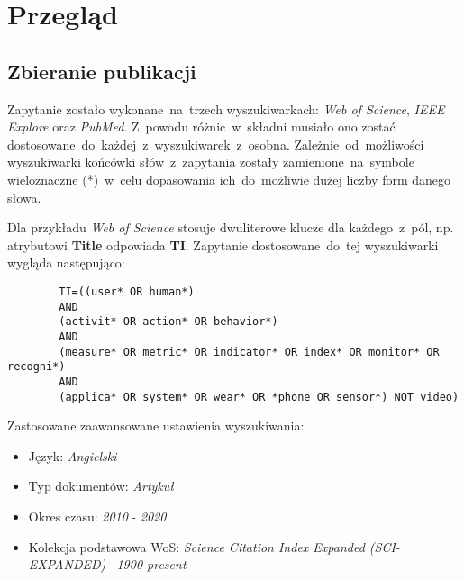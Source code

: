 \section{Przegląd}

\subsection{Zbieranie publikacji}
Zapytanie zostało wykonane~na~trzech wyszukiwarkach: \textit{Web of Science}, \textit{IEEE Explore} oraz \textit{PubMed}. Z~powodu różnic~w~składni musiało ono zostać dostosowane~do~każdej~z~wyszukiwarek~z~osobna. Zależnie~od~możliwości wyszukiwarki końcówki słów~z~zapytania zostały zamienione~na~symbole wieloznaczne (*)~w~celu dopasowania ich~do~możliwie dużej liczby form danego słowa.

Dla przykładu \textit{Web of Science} stosuje dwuliterowe klucze dla każdego~z~pól, np. atrybutowi {\bf Title} odpowiada {\bf TI}. Zapytanie dostosowane~do~tej wyszukiwarki wygląda następująco:

\bigskip
\begin{center}
	\begin{minipage}{0.85\linewidth}
		\begin{verbatim}
		TI=((user* OR human*) 
		AND 
		(activit* OR action* OR behavior*)
		AND 
		(measure* OR metric* OR indicator* OR index* OR monitor* OR recogni*) 
		AND 
		(applica* OR system* OR wear* OR *phone OR sensor*) NOT video)
		\end{verbatim}
	\end{minipage}
\end{center}
\bigskip

\noindent Zastosowane zaawansowane ustawienia wyszukiwania:
\begin{itemize}
    \item Język: {\it Angielski}
    \item Typ dokumentów: {\it Artykuł}
    \item Okres czasu: {\it 2010} - {\it 2020}
    \item Kolekcja podstawowa WoS: {\it Science Citation Index Expanded (SCI-EXPANDED) --1900-present}
\end{itemize}

